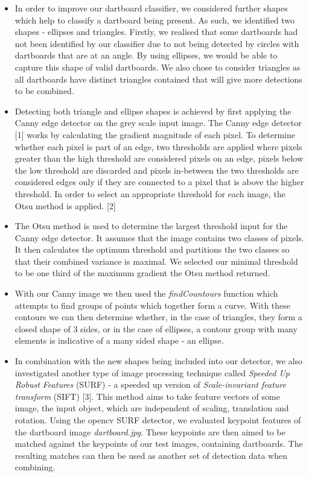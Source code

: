 \documentclass[a4paper]{article}
\begin{document}
\begin{itemize}
\item In order to improve our dartboard classifier, we considered further
  shapes which help to classify a dartboard being present.  As such, we
    identified two shapes - ellipses and triangles. Firstly, we realised that
    some dartboards had not been identified by our classifier due to not
    being detected by circles with dartboards that are at an angle. By using
    ellipses, we would be able to capture this shape of valid dartboards. We
    also chose to consider triangles as all dartboards have distinct triangles
    contained that will give more detections to be combined.

\item Detecting both triangle and ellipse shapes is achieved by first applying
  the Canny edge detector on the grey scale input image. The Canny edge
    detector [1] works by calculating the gradient magnitude of each pixel. To
    determine whether each pixel is part of an edge, two thresholds are applied
    where pixels greater than the high threshold are considered pixels on an
    edge, pixels below the low threshold are discarded and pixels in-between
    the two thresholds are considered edges only if they are connected to a
    pixel that is above the higher threshold.  In order to select an
    appropriate threshold for each image, the Otsu method is applied.  [2]

\item The Otsu method is used to determine the largest threshold input for the
  Canny edge detector. It assumes that the image contains two classes of
    pixels. It then calculates the optimum threshold and partitions the two
    classes so that their combined variance is maximal. We selected our minimal
    threshold to be one third of the maximum gradient the Otsu method returned.

\item With our Canny image we then used the \textit{findCountours} function
  which attempts to find groups of points which together form a curve. With
    these contours we can then determine whether, in the case of triangles,
    they form a closed shape of 3 sides, or in the case of ellipses, a contour
    group with many elements is indicative of a many sided shape - an ellipse.

\item In combination with the new shapes being included into our detector,
  we also investigated another type of image processing technique called
    \textit{Speeded Up Robust Features} (SURF) - a speeded up version of
    \textit{Scale-invariant feature transform} (SIFT) [3]. This method aims to
    take feature vectors of some image, the input object, which are independent
    of scaling, translation and rotation. Using the opencv SURF detector, we
    evaluated keypoint features of the dartboard image \textit{dartboard.jpg}.
    These keypoints are then aimed to be matched against the keypoints of our
    test images, containing dartboards. The resulting matches can then be used as
    another set of detection data when combining.


\end{itemize}
\end{document}
